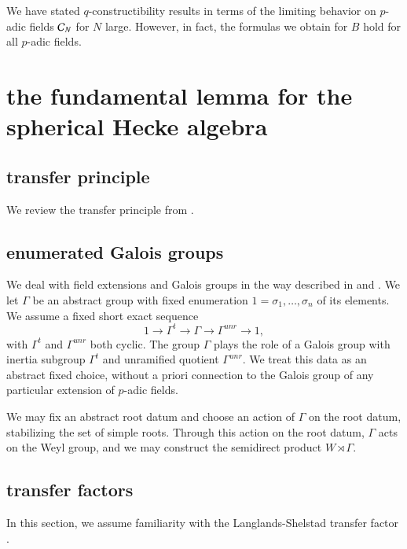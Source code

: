 \begin{remark}  We have stated $q$-constructibility results in terms of the limiting behavior on
$p$-adic fields $\mathcal C_N$ for $N$ large.  However, in fact, the formulas we obtain for $B$  hold for all
$p$-adic fields.
\end{remark}

\section{the fundamental lemma for the spherical Hecke algebra}


\subsection{transfer principle}

We review the transfer principle from \cite{cluckers2010constructible}.

\subsection{enumerated Galois groups}

We deal with field extensions and Galois groups in the way described in \cite{gordon} and \cite{cluckers2011transfer}.
We let $\Gamma$ be an abstract group with fixed enumeration $1=\sigma_1,\ldots,\sigma_n$ of its elements.  We
assume a fixed short exact sequence
\[
1\to \Gamma^t\to\Gamma\to\Gamma^{unr}\to 1,
\]
with $\Gamma^t$ and $\Gamma^{unr}$ both cyclic.
The group $\Gamma$ plays the role of a Galois group with inertia subgroup $\Gamma^t$ and unramified quotient $\Gamma^{unr}$.
We treat this data as an abstract fixed choice, without a priori connection to the Galois group of any particular extension of 
$p$-adic fields.  

We may fix an abstract root datum and choose an action of $\Gamma$ on the root datum, stabilizing the set of simple roots.
Through this action on the root datum, $\Gamma$ acts on the Weyl group, and we may construct the semidirect product $W\rtimes \Gamma$.

\subsection{transfer factors}

In this section, we assume familiarity with the Langlands-Shelstad transfer factor \cite{langlands1987definition}.

